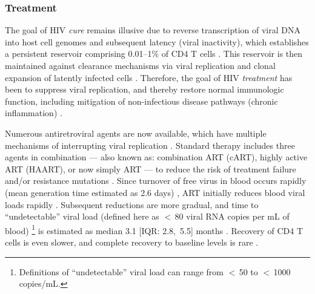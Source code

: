 \subsubsection{Treatment}\label{intro.hiv.resp.treat}
The goal of HIV \emph{cure} remains illusive due to
reverse transcription of viral DNA into host cell genomes and subsequent latency (viral inactivity),
which establishes a persistent reservoir comprising 0.01--1\% of CD4 T cells \cite{Ndungu2019}.
This reservoir is then maintained against clearance mechanisms via
viral replication and clonal expansion of latently infected cells
\cite{Maartens2014,Ndungu2019}.
Therefore, the goal of HIV \emph{treatment} has been to suppress viral replication,
and thereby restore normal immunologic function,
including mitigation of non-infectious disease pathways (\eg chronic inflammation)
\cite{Phillips2008,Deeks2015,Cihlar2016}.
\par
Numerous antiretroviral agents are now available,
which have multiple mechanisms of interrupting viral replication \cite{Maartens2014,WHO2016art}.
Standard therapy includes three agents in combination
--- also known as: combination ART (cART), highly active ART (HAART), or now simply ART ---
to reduce the risk of treatment failure and/or resistance mutations \cite{WHO2016art}.
Since turnover of free virus in blood occurs rapidly
(mean generation time estimated as 2.6 days) \cite{Perelson1996},
ART initially reduces blood viral loads rapidly \cite{Perelson1997,Maartens2014}.
Subsequent reductions are more gradual, and time to ``undetectable'' viral load
(defined here as $<$\,80 viral RNA copies per mL of blood)%
\footnote{Definitions of ``undetectable'' viral load can range from $<$\,50 to $<$\,1000 copies/mL.}
is estimated as median 3.1 [IQR: 2.8,~5.5] months \cite{Mujugira2016}.
Recovery of CD4 T cells is even slower, and complete recovery to baseline levels is rare
\cite{Battegay2006,Maartens2014}.
